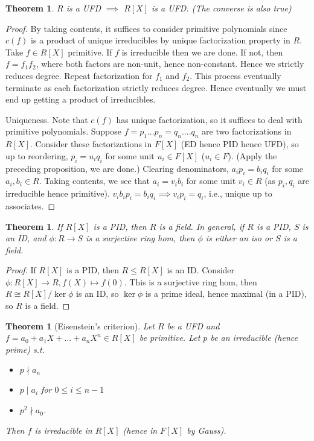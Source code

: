 \documentclass{article}
\theoremstyle{definition}
\theoremstyle{remark}
\theoremstyle{plain}
\newtheorem{thm}[defn]{Theorem}
\theoremstyle{definition}
\begin{document}
\begin{thm}
    $R$ is a UFD $\implies$ $R[X]$ is a UFD. (The converse is also true)
\end{thm}
\begin{proof}
    By taking contents, it suffices to consider primitive polynomials since $c(f)$ is a product of unique irreducibles by unique factorization property in $R$.
    Take $f\in R[X]$ primitive. If $f$ is irreducible then we are done. If not, then $f=f_1f_2$, where both factors are non-unit, hence non-constant. Hence we strictly reduces degree. Repeat factorization for $f_1$ and $f_2$. This process eventually terminate as each factorization strictly reduces degree. Hence eventually we must end up getting a product of irreducibles. 

    Uniqueness. Note that $c(f)$ has unique factorization, so it suffices to deal with primitive polynomials. Suppose $f=p_1...p_n=q_n....q_n$ are two factorizations in $R[X]$. Consider these factorizations in $F[X]$ (ED hence PID hence UFD), so up to reordering, $p_i=u_iq_i$ for some unit $u_i\in F[X]$ ($u_i\in F$). (Apply the preceding proposition, we are done.) Clearing denominators, $a_ip_i=b_iq_i$ for some $a_i,b_i\in R$. Taking contents, we see that $a_i=v_ib_i$ for some unit $v_i\in R$ (as $p_i,q_i$ are irreducible hence primitive). $v_ib_ip_i=b_iq_i\implies v_ip_i=q_i$, i.e., unique up to associates.
\end{proof}
\begin{thm}
    If $R[X]$ is a PID, then $R$ is a field. In general, if $R$ is a PID, $S$ is an ID, and $\phi:R\to S$ is a surjective ring hom, then $\phi$ is either an iso or $S$ is a field.
\end{thm}
\begin{proof}
    If $R[X]$ is a PID, then $R\le R[X]$ is an ID.
    Consider $\phi:R[X]\to R, f(X)\mapsto f(0)$. This is a surjective ring hom, then $R\cong R[X]/\ker\phi$ is an ID, so $\ker\phi$ is a prime ideal, hence maximal (in a PID), so $R$ is a field.
\end{proof}
\begin{thm}[Eisenstein's criterion]
    Let $R$ be a UFD and $f=a_0+a_1X+\ldots+a_nX^n\in R[X]$ be primitive. Let $p$ be an irreducible (hence prime) s.t. 
    \begin{itemize}
        \item $p\nmid a_n$
        \item $p\mid a_i$ for $0\le i\le n-1$
        \item $p^2\nmid a_0$.
    \end{itemize}
    Then $f$ is irreducible in $R[X]$ (hence in $F[X]$ by Gauss).
\end{thm}
\end{document}
